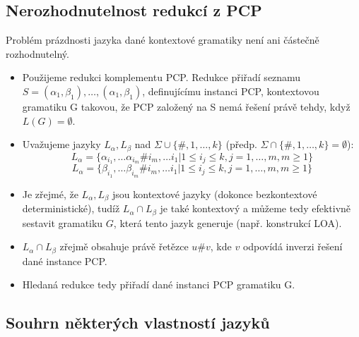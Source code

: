 \documentclass[a4paper, 11pt]{report}
\begin{document}
\subsection{Nerozhodnutelnost redukcí z PCP}
Problém prázdnosti jazyka dané kontextové gramatiky není ani částečně rozhodnutelný.
\begin{itemize}
	\item Použijeme redukci komplementu PCP. Redukce přiřadí seznamu $S = (\alpha_1, \beta_1), \dots, (\alpha_1, \beta_1)$, definujícímu instanci PCP, kontextovou gramatiku G takovou, že PCP založený na S nemá řešení právě tehdy, když $L(G) = \emptyset$.
	\item Uvažujeme jazyky $L_\alpha, L_\beta$ nad $\Sigma \cup \{\#, 1, \dots, k\}$ (předp. $\Sigma \cap \{\#, 1, \dots, k\} = \emptyset$):
	$$L_\alpha = \{\alpha_{i_1}, \dots \alpha_{i_m} \# i_m, \dots i_1 | 1 \leq i_j \leq k, j = 1, \dots, m, m \geq 1\} $$
	$$L_\alpha = \{\beta_{i_1}, \dots \beta_{i_m} \# i_m, \dots i_1 | 1 \leq i_j \leq k, j = 1, \dots, m, m \geq 1\} $$
	\item Je zřejmé, že $L_\alpha, L_\beta$ jsou kontextové jazyky (dokonce bezkontextové deterministické), tudíž $L_\alpha \cap L_\beta$ je také kontextový a můžeme tedy efektivně sestavit gramatiku $G$, která tento jazyk generuje (např. konstrukcí LOA).
	\item $L_\alpha \cap L_\beta$ zřejmě obsahuje právě řetězce $u\#v$, kde $v$ odpovídá inverzi řešení dané instance PCP.
	\item Hledaná redukce tedy přiřadí dané instanci PCP gramatiku G.
\end{itemize}

\subsection{Souhrn některých vlastností jazyků}
\end{document}
